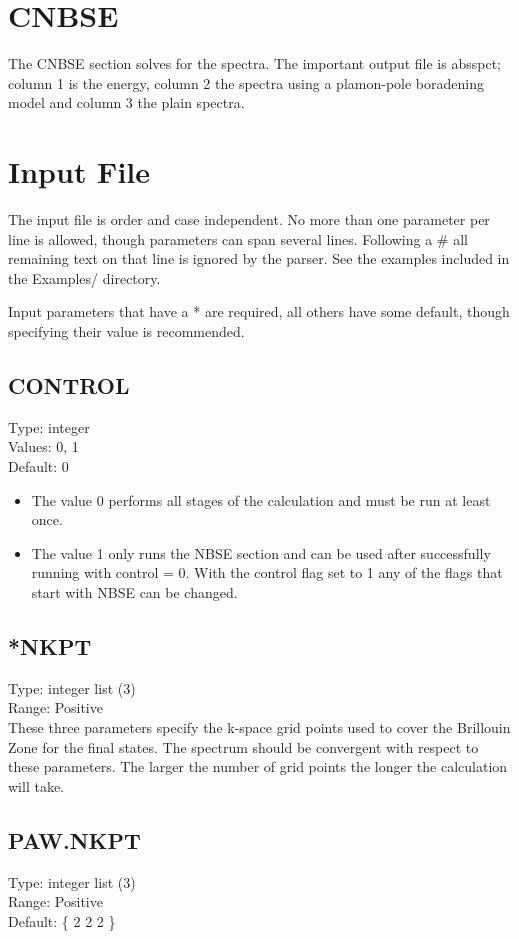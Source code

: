 \documentclass[12pt]{article}
\begin{document}
\section{ CNBSE }
The CNBSE section solves for the spectra. The important output file is absspct; column 1 is the energy, 
column 2 the spectra using a plamon-pole boradening model and column 3 the plain spectra.

\section{Input File}
\label{sec:Control-Items}
The input file is order and case independent. No more than one parameter per line is allowed, though parameters can span several lines. Following a \# all remaining text on that line is ignored by the parser. See the examples included in the Examples/ directory.  

Input parameters that have a * are required, all others have some default, though specifying their value is recommended.

\subsection{CONTROL}
Type: integer \\
Values: 0, 1 \\
Default: 0
\begin{itemize}
\item The value 0 performs all stages of the calculation and must be run at least once. 

\item The value 1 only runs the \textsc{NBSE} section and can be used after successfully running with control = 0. With the control flag set to 1 any of the flags that start with NBSE can be changed.
\end{itemize}
\subsection{*NKPT}
Type: integer list (3) \\
Range: Positive \\

These three parameters specify the k-space grid points used to cover the Brillouin Zone for the final
states.  The spectrum should be convergent with respect to these parameters. The larger the number of 
grid points the longer the calculation will take. 

\subsection{PAW.NKPT}
Type: integer list (3) \\
Range: Positive \\
Default: \{ 2 2 2 \} \\
\end{document}
